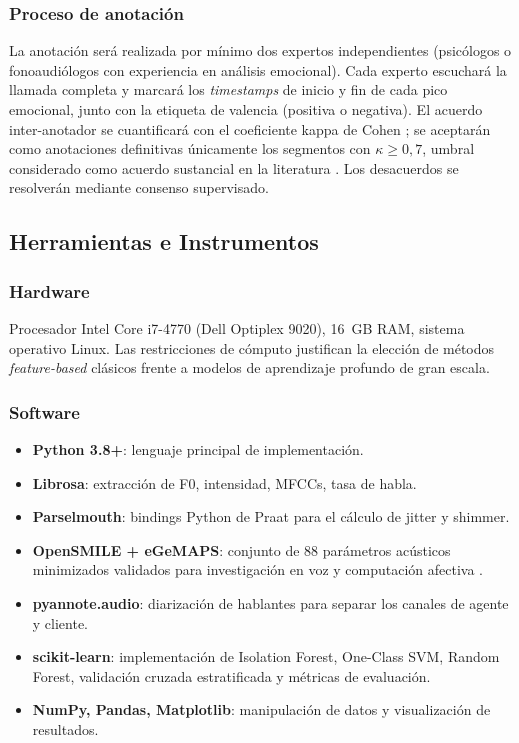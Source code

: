 \subsubsection{Proceso de anotación}

La anotación será realizada por mínimo dos expertos independientes (psicólogos o
fonoaudiólogos con experiencia en análisis emocional). Cada experto escuchará la
llamada completa y marcará los \textit{timestamps} de inicio y fin de cada pico
emocional, junto con la etiqueta de valencia (positiva o negativa). El acuerdo
inter-anotador se cuantificará con el coeficiente kappa de Cohen \cite{cohen1960kappa};
se aceptarán como anotaciones definitivas únicamente los segmentos con $\kappa \geq
0{,}7$, umbral considerado como acuerdo sustancial en la literatura \cite{cohen1960kappa}.
Los desacuerdos se resolverán mediante consenso supervisado.

\subsection{Herramientas e Instrumentos}
\label{sec:met_herramientas}

\subsubsection{Hardware}

Procesador Intel Core i7-4770 (Dell Optiplex 9020), 16~GB RAM, sistema operativo
Linux. Las restricciones de cómputo justifican la elección de métodos \textit{feature-based}
clásicos frente a modelos de aprendizaje profundo de gran escala.

\subsubsection{Software}

\begin{itemize}
    \item \textbf{Python 3.8+}: lenguaje principal de implementación.
    \item \textbf{Librosa}: extracción de F0, intensidad, MFCCs, tasa de habla.
    \item \textbf{Parselmouth}: bindings Python de Praat para el cálculo de jitter
          y shimmer.
    \item \textbf{OpenSMILE + eGeMAPS}: conjunto de 88 parámetros acústicos
          minimizados validados para investigación en voz y computación afectiva
          \cite{eyben2016gemaps}.
    \item \textbf{pyannote.audio}: diarización de hablantes para separar los canales
          de agente y cliente.
    \item \textbf{scikit-learn}: implementación de Isolation Forest, One-Class SVM,
          Random Forest, validación cruzada estratificada y métricas de evaluación.
    \item \textbf{NumPy, Pandas, Matplotlib}: manipulación de datos y visualización
          de resultados.
\end{itemize}

